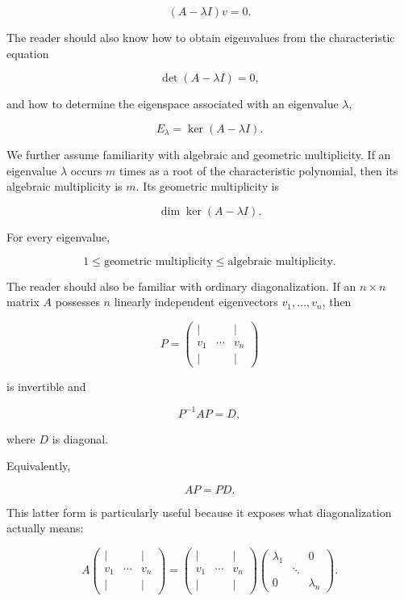 \documentclass[11pt]{article}
\begin{document}
\[
(A-\lambda I)v=0.
\]

The reader should also know how to obtain eigenvalues from the
characteristic equation

\[
\det(A-\lambda I)=0,
\]

and how to determine the eigenspace associated with an eigenvalue
\(\lambda\),

\[
E_\lambda
=
\ker(A-\lambda I).
\]

We further assume familiarity with algebraic and geometric
multiplicity.  If an eigenvalue \(\lambda\) occurs \(m\) times as a
root of the characteristic polynomial, then its algebraic multiplicity
is \(m\).  Its geometric multiplicity is

\[
\dim\ker(A-\lambda I).
\]

For every eigenvalue,

\[
1
\leq
\text{geometric multiplicity}
\leq
\text{algebraic multiplicity}.
\]

The reader should also be familiar with ordinary diagonalization.  If
an \(n\times n\) matrix \(A\) possesses \(n\) linearly independent
eigenvectors \(v_1,\ldots,v_n\), then

\[
P=
\begin{pmatrix}
\vert & & \vert\\
v_1 & \cdots & v_n\\
\vert & & \vert
\end{pmatrix}
\]

is invertible and

\[
P^{-1}AP=D,
\]

where \(D\) is diagonal.

Equivalently,

\[
AP=PD.
\]

This latter form is particularly useful because it exposes what
diagonalization actually means:

\[
A
\begin{pmatrix}
\vert & & \vert\\
v_1 & \cdots & v_n\\
\vert & & \vert
\end{pmatrix}
=
\begin{pmatrix}
\vert & & \vert\\
v_1 & \cdots & v_n\\
\vert & & \vert
\end{pmatrix}
\begin{pmatrix}
\lambda_1 & & 0\\
& \ddots &\\
0 & & \lambda_n
\end{pmatrix}.
\]
\end{document}
